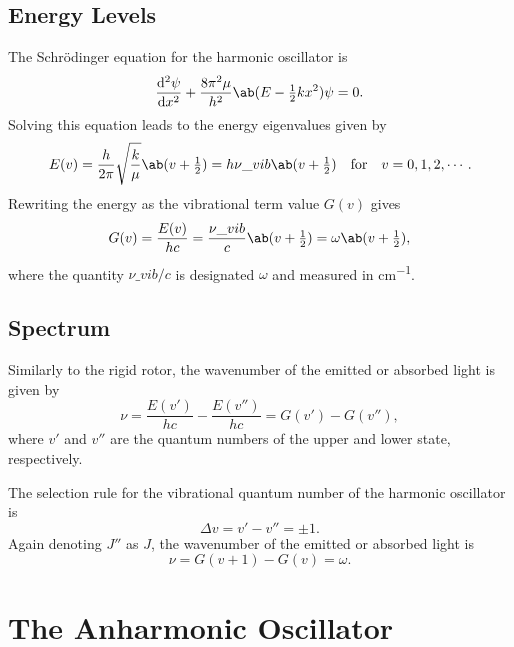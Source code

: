 \subsection{Energy Levels}

The Schr\"odinger equation for the harmonic oscillator is
\begin{equation*}
    \odv[2]{\psi}{x} + \frac{8\pi^{2}\mu}{h^{2}}\ab(E - \tfrac{1}{2}kx^{2})\psi = 0.
\end{equation*}
Solving this equation leads to the energy eigenvalues given by
\begin{equation*}
    E(v) = \frac{h}{2\pi}\sqrt{\frac{k}{\mu}}\ab(v + \tfrac{1}{2}) = h\nu\_{vib}\ab(v + \tfrac{1}{2}) \quad\text{for}\quad v = 0, 1, 2, \dotsb.
\end{equation*}
Rewriting the energy as the vibrational term value $G(v)$ gives
\begin{equation*}
    G(v) = \frac{E(v)}{hc} = \frac{\nu\_{vib}}{c}\ab(v + \tfrac{1}{2}) = \omega\ab(v + \tfrac{1}{2}),
\end{equation*}
where the quantity $\nu\_{vib}/c$ is designated $\omega$ and measured in \unit{cm^{-1}}.

\subsection{Spectrum}

Similarly to the rigid rotor, the wavenumber of the emitted or absorbed light is given by
\begin{equation*}
    \nu = \frac{E(v')}{hc} - \frac{E(v'')}{hc} = G(v') - G(v''),
\end{equation*}
where $v'$ and $v''$ are the quantum numbers of the upper and lower state, respectively.

The selection rule for the vibrational quantum number of the harmonic oscillator is
\begin{equation*}
    \Delta{}v = v' - v'' = \pm 1.
\end{equation*}
Again denoting $J''$ as $J$, the wavenumber of the emitted or absorbed light is
\begin{equation*}
    \nu = G(v + 1) - G(v) = \omega.
\end{equation*}

\section{The Anharmonic Oscillator}
\label{s:the_anharmonic_oscillator}

